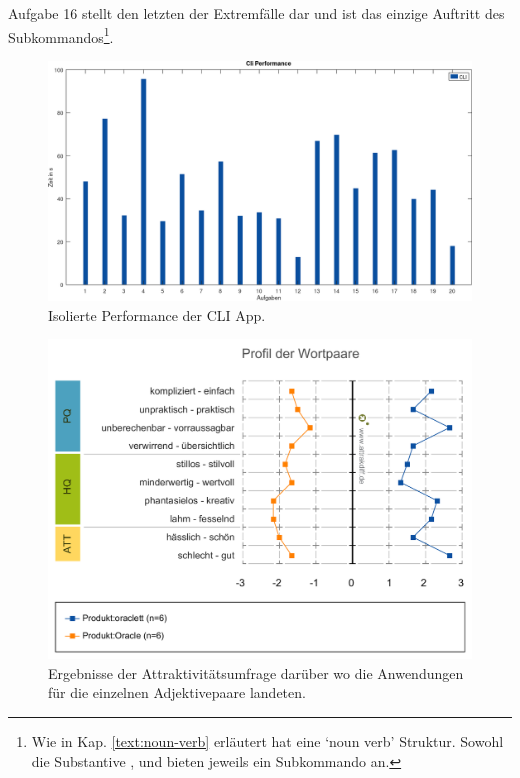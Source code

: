 \documentclass[oneside,bibliography=totocnumbered,BCOR=5mm]{scrbook}
\begin{document}
Aufgabe 16 stellt den letzten der Extremfälle dar und ist das einzige Auftritt
des  Subkommandos\footnote{Wie in Kap. \ref{text:noun-verb}
erläutert hat  eine `noun verb' Struktur. Sowohl
die Substantive ,  und
 bieten jeweils ein  Subkommando an.}.

\begin{figure}[H]
  \centering
  \includegraphics[scale=0.36]{performance-cli.png}
  \caption{Isolierte Performance der CLI App.}
  \label{fig:performance-cli}
\end{figure}

\begin{figure}[H]
  \centering
  \includegraphics[scale=0.35]{attrak-wortpaare.png}
  \caption{Ergebnisse der Attraktivitätsumfrage darüber wo die Anwendungen für die einzelnen Adjektivepaare landeten.}
  \label{fig:attrak-wortpaare}
\end{figure}
\end{document}

